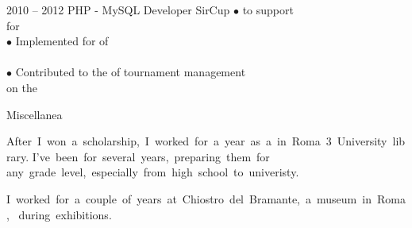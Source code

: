 \documentclass[9pt]{developercv} %
\newcommand{\myHilight}[2]{\tcbtp{\textit{\color{#1}{#2}}}}
\begin{document}
\begin{entrylist}
	\entry
		{2010 -- 2012} %
		{PHP - MySQL Developer}
		{SirCup}
		{
            $\bullet$ \myHilight{textcolor}{Designed, developed, and maintained MySQL databases} 
                      to support \myHilight{textcolor}{data tracking}\\
                      \hspace*{0.7em}for \myHilight{textcolor}{sport tournament operations}\\
            $\bullet$ Implemented \myHilight{textcolor}{PHP routines} for 
                      \myHilight{textcolor}{dynamic data handling and web presentation} of\\
                      \hspace*{0.7em}\myHilight{textcolor}{tournament results and schedules}\\
            $\bullet$ Contributed to the \myHilight{textcolor}{automation and customization} 
                      of tournament management \\
                      \hspace*{0.7em}on the \myHilight{textcolor}{company’s platform}\\
        }

	
    \entry
	    { Miscellanea }
	    {}
	    {}
	    {\mbox{After I won a scholarship, I worked for a year as a \myHilight{textcolor}{librarian} 
        in Roma 3 University library.} \linebreak \mbox{I’ve been \myHilight{textcolor}{tutoring students 
        in mathematics and physics} for several years, preparing them for} 
        \linebreak 
        \mbox{any grade level, especially from high school to univeristy.}

        \mbox{I worked for a couple of years at Chiostro del Bramante, 
        a museum in Roma,}
        \linebreak
        \myHilight{textcolor}{keeping watch on} \mbox{\myHilight{textcolor}{artworks} during exhibitions.}}
\end{entrylist}
\end{document}
